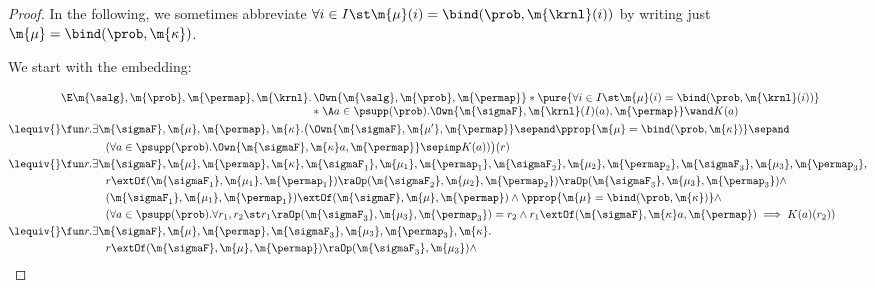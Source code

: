 \documentclass[acmsmall,nonacm,screen,appendix]{acmart}
\begin{document}
\begin{proof}
	In the following, we sometimes abbreviate
	${\forall i\in I\st
                \m{\mu}(i) = \bind(\prob, \m{\krnl}(i))}$
	by writing just ${\m{\mu} = \bind(\prob, \m{\kappa})}$.

	We start with the embedding:

	\begin{align*}
				&\begin{array}[t]{@{}r@{\,}l@{}}
        \E \m{\salg}, \m{\prob}, \m{\permap}, \m{\krnl}.
        & \Own{\m{\salg}, \m{\prob}, \m{\permap}} *
        \pure{\forall i\in I\st
                \m{\mu}(i) = \bind(\prob, \m{\krnl}(i))}
        \\ & * \;
        \A a \in \psupp(\prob).
          \Own{\m{\sigmaF}, \m{\krnl}(I)(a), \m{\permap}}
          \wand
            K(a)
 			 \end{array}\\
{}\lequiv {} &
				\fun r.
        \exists \m{\sigmaF}, \m{\mu}, \m{\permap}, \m{\kappa}.
        \big(\Own{\m{\sigmaF}, \m{\mu'}, \m{\permap}} \sepand
				\pprop{\m{\mu} = \bind(\prob, \m{\kappa})} \sepand \\
					&\qquad \qquad
        (\forall a \in \psupp(\prob). \Own{\m{\sigmaF}, \m{\kappa} a, \m{\permap}} \sepimp K(a)) \big) (r) \\
{}\lequiv {} &
			 \fun r.
				\exists \m{\sigmaF}, \m{\mu},  \m{\permap},  \m{\kappa},
				\m{\sigmaF_1}, \m{\mu_1},  \m{\permap_1},
				\m{\sigmaF_2}, \m{\mu_2}, \m{\permap_2},
				\m{\sigmaF_3}, \m{\mu_3}, \m{\permap_3}, \\
				&\qquad \qquad
				r \extOf (\m{\sigmaF_1}, \m{\mu_1}, \m{\permap_1}) \raOp
				(\m{\sigmaF_2}, \m{\mu_2}, \m{\permap_2}) \raOp (\m{\sigmaF_3}, \m{\mu_3}, \m{\permap_3}) \land\\
				&\qquad \qquad
				(\m{\sigmaF_1}, \m{\mu_1}, \m{\permap_1}) \extOf (\m{\sigmaF}, \m{\mu}, \m{\permap})  \land
				\pprop{\m{\mu} = \bind(\prob, \m{\kappa})} \land \\
				&\qquad \qquad
				(\forall a \in \psupp(\prob). \forall r_1, r_2 \st
				r_1 \raOp (\m{\sigmaF_3}, \m{\mu_3}, \m{\permap_3}) = r_2 \land
				r_1 \extOf (\m{\sigmaF}, \m{\kappa} a, \m{\permap})
				\implies K(a)(r_2))\\
{}\lequiv {} &
				\fun r.
				\exists \m{\sigmaF}, \m{\mu}, \m{\permap},
				\m{\sigmaF_3}, \m{\mu_3}, \m{\permap_3}, \m{\kappa}. \\
				& \qquad \qquad
				r \extOf
				(\m{\sigmaF}, \m{\mu}, \m{\permap})  \raOp (\m{\sigmaF_3}, \m{\mu_3}) \land

\end{align*}
\end{proof}
\end{document}
